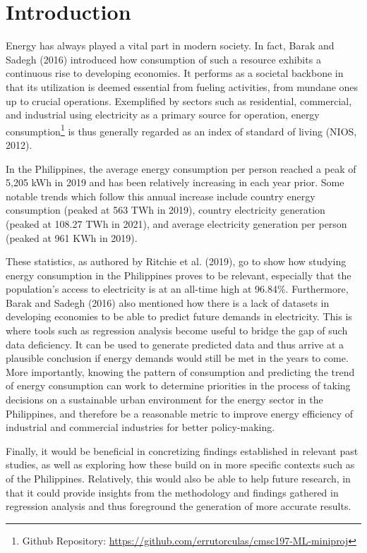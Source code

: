 \documentclass[runningheads]{llncs}
\begin{document}
\section{Introduction}
Energy has always played a vital part in modern society. In fact, Barak and Sadegh (2016) introduced how consumption of such a resource exhibits a continuous rise to developing economies. It performs as a societal backbone in that its utilization is deemed essential from fueling activities, from mundane ones up to crucial operations. Exemplified by sectors such as residential, commercial, and industrial using electricity as a primary source for operation, energy consumption\footnote{Github Repository: \url{https://github.com/errutorculas/cmsc197-ML-miniproj}} is thus generally regarded as an index of standard of living (NIOS, 2012).

In the Philippines, the average energy consumption per person reached a peak of 5,205 kWh in 2019 and has been relatively increasing in each year prior. Some notable trends which follow this annual increase include country energy consumption (peaked at 563 TWh in 2019), country electricity generation (peaked at 108.27 TWh in 2021), and average electricity generation per person (peaked at 961 KWh in 2019). 

These statistics, as authored by Ritchie et al. (2019), go to show how studying energy consumption in the Philippines proves to be relevant, especially that the population’s access to electricity is at an all-time high at 96.84\%. Furthermore, Barak and Sadegh (2016) also mentioned how there is a lack of datasets in developing economies to be able to predict future demands in electricity. This is where tools such as regression analysis become useful to bridge the gap of such data deficiency. It can be used to generate predicted data and thus arrive at a plausible conclusion if energy demands would still be met in the years to come. More importantly, knowing the pattern of consumption and predicting the trend of energy consumption can work to determine priorities in the process of taking decisions on a sustainable urban environment for the energy sector in the Philippines, and therefore be a reasonable metric to improve energy efficiency of industrial and commercial industries for better policy-making. 

Finally, it would be beneficial in concretizing findings established in relevant past studies, as well as exploring how these build on in more specific contexts such as of the Philippines. Relatively, this would also be able to help future research, in that it could provide insights from the methodology and findings gathered in regression analysis and thus foreground the generation of more accurate results.
\end{document}
